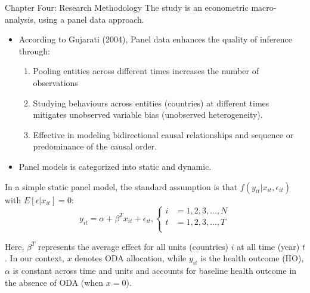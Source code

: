 \documentclass[aspectratio=169,handout, 10pt]{beamer}
\begin{document}
\begin{frame}{Chapter Four: Research Methodology}
The study is an econometric macro-analysis, using a panel data approach. 
\begin{itemize}
    \item According to Gujarati (2004), Panel data enhances the quality of inference through: 
    \begin{enumerate}
        \item Pooling entities across different times increases the number of observations
        \item Studying behaviours across entities (countries) at different times mitigates unobserved variable bias (unobserved heterogeneity).
        \item Effective in modeling bidirectional causal relationships and sequence or predominance of the causal order.
    \end{enumerate}
\item  Panel models is categorized into static and dynamic.
\end{itemize}
In a simple static panel model, the standard assumption is that $f(y_{it}|x_{it}, \epsilon_{it})$ with $E[\epsilon | x_{it}]  = 0$:
\begin{equation}
    y_{it} = \alpha + \beta^T x_{it} + \epsilon_{it},
    \begin{cases}
        i & = 1, 2, 3, \ldots, N \\
        t & = 1, 2, 3, \ldots, T \\
    \end{cases}
    \label{eq1}
\end{equation}

Here, $\beta^T$ represents the average effect for all units (countries) $i$ at all time (year) $t$. In our context, $x$ denotes ODA allocation, while $y_{it}$ is the health outcome (HO), $\alpha$ is constant across time and units and accounts for baseline health outcome in the absence of ODA (when $x=0$).
\end{frame}
\end{document}
